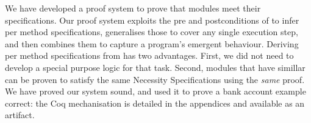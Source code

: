 We have developed a proof system to prove that modules meet their specifications.  Our proof system exploits the
pre and
postconditions of \funcSpecs to infer per method \Nec specifications, 
generalises those to cover any single execution step,
and then combines them to capture a program's emergent behaviour.
%
%
%
%
%
Deriving per method \Nec specifications from \funcSpecs
has two advantages. First, we
did not need to develop a special purpose logic for that task. Second,
modules that have simillar \funcSpecs can be proven to satisfy the same Necessity
Specifications using the \emph{same} proof.
%
%
We have proved our system sound, and used it to
prove a bank account example correct: the Coq mechanisation is
detailed in the appendices and available as an artifact.

%
%
%
%

%
%






